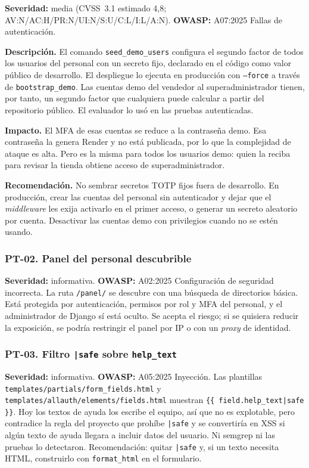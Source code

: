 \documentclass[stu,12pt,floatsintext]{apa7}
\newcommand{\ruta}[1]{{\urlstyle{tt}\nolinkurl{#1}}}
\begin{document}
\textbf{Severidad:} media (CVSS~3.1 estimado 4,8; AV:N/AC:H/PR:N/UI:N/S:U/C:L/I:L/A:N). \textbf{OWASP:}
A07:2025 Fallas de autenticación.

\textbf{Descripción.} El comando \ruta{seed_demo_users} configura el segundo factor de todos los
usuarios del personal con un secreto fijo, declarado en el código como valor público de desarrollo. El
despliegue lo ejecuta en producción con \texttt{--force} a través de \ruta{bootstrap_demo}. Las cuentas
demo del vendedor al superadministrador tienen, por tanto, un segundo factor que cualquiera puede
calcular a partir del repositorio público. El evaluador lo usó en las pruebas autenticadas.

\textbf{Impacto.} El MFA de esas cuentas se reduce a la contraseña demo. Esa contraseña la genera Render
y no está publicada, por lo que la complejidad de ataque es alta. Pero es la misma para todos los
usuarios demo: quien la reciba para revisar la tienda obtiene acceso de superadministrador.

\textbf{Recomendación.} No sembrar secretos TOTP fijos fuera de desarrollo. En producción, crear las
cuentas del personal sin autenticador y dejar que el \textit{middleware} les exija activarlo en el
primer acceso, o generar un secreto aleatorio por cuenta. Desactivar las cuentas demo con privilegios
cuando no se estén usando.

\subsubsection{PT-02. Panel del personal descubrible}

\textbf{Severidad:} informativa. \textbf{OWASP:} A02:2025 Configuración de seguridad incorrecta.
La ruta \ruta{/panel/} se descubre con una búsqueda de directorios básica. Está protegida por
autenticación, permisos por rol y MFA del personal, y el administrador de Django sí está oculto. Se
acepta el riesgo; si se quisiera reducir la exposición, se podría restringir el panel por IP o con un
\textit{proxy} de identidad.

\subsubsection{PT-03. Filtro \texttt{|safe} sobre \texttt{help\_text}}

\textbf{Severidad:} informativa. \textbf{OWASP:} A05:2025 Inyección. Las plantillas
\ruta{templates/partials/form_fields.html} y \ruta{templates/allauth/elements/fields.html} muestran
\texttt{\{\{ field.help\_text|safe \}\}}. Hoy los textos de ayuda los escribe el equipo, así que no es
explotable, pero contradice la regla del proyecto que prohíbe \texttt{|safe} y se convertiría en XSS si
algún texto de ayuda llegara a incluir datos del usuario. Ni semgrep ni las pruebas lo detectaron.
Recomendación: quitar \texttt{|safe} y, si un texto necesita HTML, construirlo con
\texttt{format\_html} en el formulario.
\end{document}
